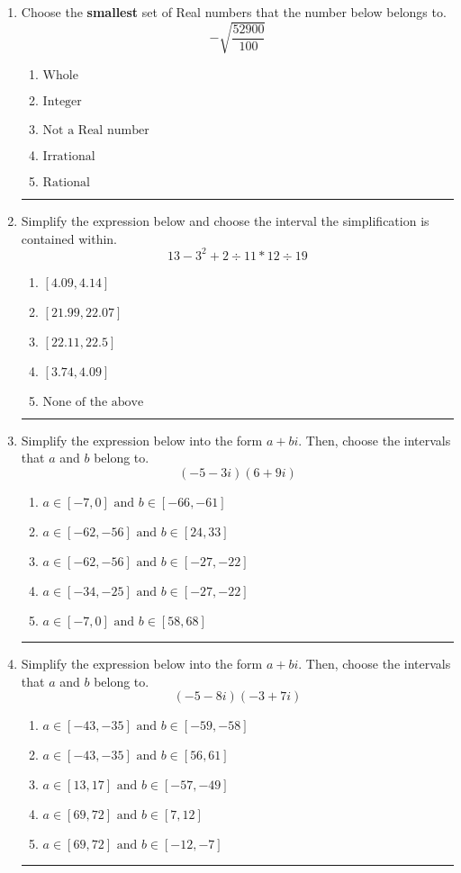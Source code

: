 \documentclass[14pt]{extbook}
\newcommand{\litem}[1]{\item#1\hspace*{-1cm}\rule{\textwidth}{0.4pt}}
\begin{document}
\begin{enumerate}
\litem{
Choose the \textbf{smallest} set of Real numbers that the number below belongs to.\[ -\sqrt{\frac{52900}{100}} \]\begin{enumerate}[label=\Alph*.]
\item \( \text{Whole} \)
\item \( \text{Integer} \)
\item \( \text{Not a Real number} \)
\item \( \text{Irrational} \)
\item \( \text{Rational} \)

\end{enumerate} }
\litem{
Simplify the expression below and choose the interval the simplification is contained within.\[ 13 - 3^2 + 2 \div 11 * 12 \div 19 \]\begin{enumerate}[label=\Alph*.]
\item \( [4.09, 4.14] \)
\item \( [21.99, 22.07] \)
\item \( [22.11, 22.5] \)
\item \( [3.74, 4.09] \)
\item \( \text{None of the above} \)

\end{enumerate} }
\litem{
Simplify the expression below into the form $a+bi$. Then, choose the intervals that $a$ and $b$ belong to.\[ (-5 - 3 i)(6 + 9 i) \]\begin{enumerate}[label=\Alph*.]
\item \( a \in [-7, 0] \text{ and } b \in [-66, -61] \)
\item \( a \in [-62, -56] \text{ and } b \in [24, 33] \)
\item \( a \in [-62, -56] \text{ and } b \in [-27, -22] \)
\item \( a \in [-34, -25] \text{ and } b \in [-27, -22] \)
\item \( a \in [-7, 0] \text{ and } b \in [58, 68] \)

\end{enumerate} }
\litem{
Simplify the expression below into the form $a+bi$. Then, choose the intervals that $a$ and $b$ belong to.\[ (-5 - 8 i)(-3 + 7 i) \]\begin{enumerate}[label=\Alph*.]
\item \( a \in [-43, -35] \text{ and } b \in [-59, -58] \)
\item \( a \in [-43, -35] \text{ and } b \in [56, 61] \)
\item \( a \in [13, 17] \text{ and } b \in [-57, -49] \)
\item \( a \in [69, 72] \text{ and } b \in [7, 12] \)
\item \( a \in [69, 72] \text{ and } b \in [-12, -7] \)


\end{enumerate}}
\end{enumerate}
\end{document}
